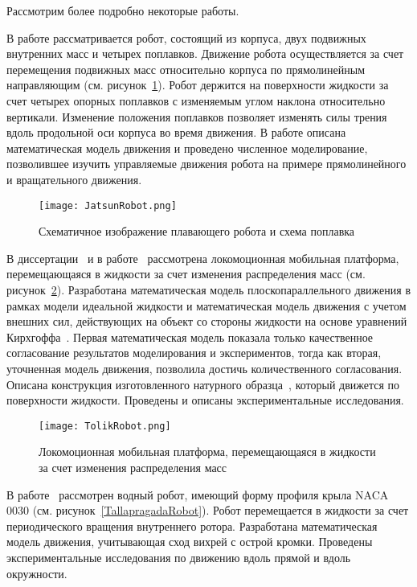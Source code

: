 Рассмотрим более подробно некоторые работы.

В работе \cite{Volkova_Jatsun} рассматривается робот, состоящий из корпуса, двух подвижных внутренних масс и четырех поплавков. Движение робота осуществляется за счет перемещения подвижных масс относительно корпуса по прямолинейным направляющим (см. рисунок~\ref{JatsunRobot}). Робот держится на поверхности жидкости за счет четырех опорных поплавков с изменяемым углом наклона относительно вертикали. Изменение положения поплавков позволяет изменять силы трения вдоль продольной оси корпуса во время движения. В работе описана математическая модель движения и проведено численное моделирование, позволившее изучить управляемые движения робота на примере прямолинейного и вращательного движения.

\begin{figure}[h]
	\centering
	\texttt{[image: JatsunRobot.png]}%
	\caption{Схематичное изображение плавающего робота и схема поплавка}
	\label{JatsunRobot}
\end{figure}

В диссертации~\cite{Klenov_diss} и в работе~\cite{Klenov_Kilin_2016} рассмотрена локомоционная мобильная платформа, перемещающаяся в жидкости за счет изменения распределения масс (см. рисунок~\ref{TolikRobot}). Разработана математическая модель плоскопараллельного движения в рамках модели идеальной жидкости и математическая модель движения с учетом внешних сил, действующих на объект со стороны жидкости на основе уравнений Кирхгоффа~\cite{Kirchhoff}. Первая математическая модель показала только качественное согласование результатов моделирования и экспериментов, тогда как вторая, уточненная модель движения, позволила достичь количественного согласования. Описана конструкция изготовленного натурного образца~\cite{patent_BNR}, который движется по поверхности жидкости. Проведены и описаны экспериментальные исследования. 

\begin{figure}[h]
	\centering
	\texttt{[image: TolikRobot.png]}%
	\caption{Локомоционная мобильная платформа, перемещающаяся в жидкости за счет изменения распределения масс}
	\label{TolikRobot}
\end{figure}

В работе~\cite{Pollard_Tallapragada_2016} рассмотрен водный робот, имеющий форму профиля крыла NACA 0030 (см. рисунок~\ref{TallapragadaRobot}). Робот перемещается в жидкости за счет периодического вращения внутреннего ротора. Разработана математическая модель движения, учитывающая сход вихрей с острой кромки. Проведены экспериментальные исследования по движению вдоль прямой и вдоль окружности. 

